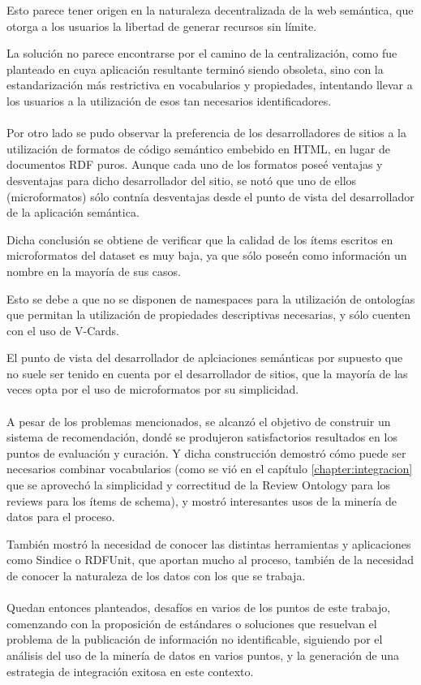 Esto parece tener origen en la naturaleza decentralizada de la web semántica, que otorga 
a los usuarios la libertad de generar recursos sin límite.

La solución no parece encontrarse por el camino de la centralización, como fue planteado en \cite{Heath2006J} cuya
aplicación resultante terminó siendo obsoleta,
sino con la estandarización más restrictiva en vocabularios y propiedades, intentando 
llevar a los usuarios a la utilización de esos tan necesarios identificadores.
\\\\
Por otro lado se pudo observar la preferencia de los desarrolladores de sitios a la utilización de 
formatos de código semántico embebido en HTML, en lugar de documentos RDF puros. Aunque cada uno de 
los formatos poseé ventajas y desventajas para dicho desarrollador del sitio, se notó que uno de ellos 
(microformatos) sólo contnía desventajas desde el punto de vista del desarrollador de la aplicación 
semántica. 

Dicha conclusión  se obtiene de verificar que la calidad de los ítems escritos en microformatos del 
dataset es muy baja, ya que sólo poseén como información un nombre en la mayoría de sus casos.

Esto se debe a que no se disponen de namespaces para la utilización de ontologías que permitan 
la utilización de propiedades descriptivas necesarias, y sólo cuenten con el uso de V-Cards.

El punto de vista del desarrollador de aplciaciones semánticas por supuesto que no suele ser tenido 
en cuenta por el desarrollador de sitios, que la mayoría de las veces opta por el uso de 
microformatos por su simplicidad.
\\\\
A pesar de los problemas mencionados, se alcanzó el objetivo de construir un sistema de recomendación, 
dondé se produjeron satisfactorios resultados en los puntos de evaluación y curación. 
Y dicha construcción demostró cómo puede ser necesarios combinar vocabularios (como se vió en 
el capítulo \ref{chapter:integracion} que se aprovechó la simplicidad y correctitud de la 
Review Ontology para los reviews para los ítems de schema), y mostró interesantes usos 
de la minería de datos para el proceso.

También mostró la necesidad de conocer las distintas herramientas y aplicaciones como Sindice 
o RDFUnit, que aportan mucho al proceso, también de la necesidad de conocer la naturaleza de 
los datos con los que se trabaja.
\\\\
Quedan entonces planteados, desafíos en varios de los puntos de este trabajo, comenzando con 
la proposición de estándares o soluciones que resuelvan el problema de la publicación de información 
no identificable, siguiendo por el análisis del uso de la minería de datos en varios puntos, y 
la generación de una estrategia de integración exitosa en este contexto. 

